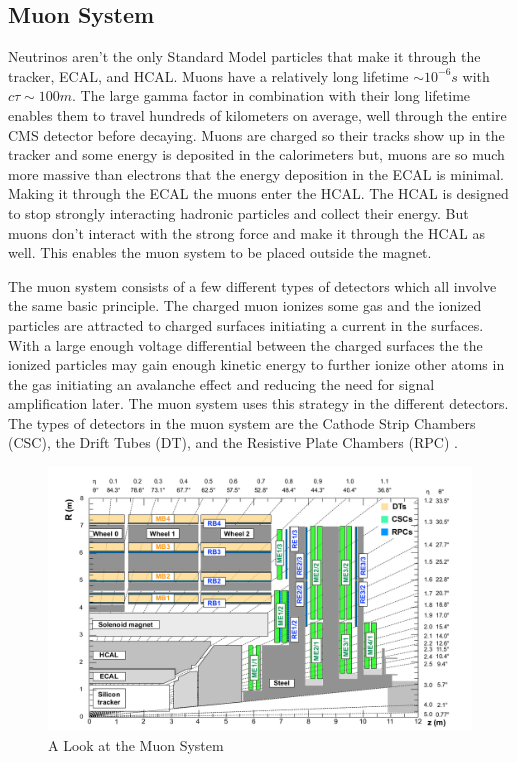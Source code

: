 \subsection{Muon System}
Neutrinos aren't the only Standard Model particles that make it through the tracker, ECAL, and HCAL. Muons have a relatively long lifetime $\sim 10^{-6} s$  with $c\tau \sim 100 m$. The large gamma factor in combination with their long lifetime enables them to travel hundreds of kilometers on average, well through the entire CMS detector before decaying. Muons are charged so their tracks show up in the tracker and some energy is deposited in the calorimeters but, muons are so much more massive than electrons that the energy deposition in the ECAL is minimal. Making it through the ECAL the muons enter the HCAL. The HCAL is designed to stop strongly interacting hadronic particles and collect their energy. But muons don't interact with the strong force and make it through the HCAL as well. This enables the muon system to be placed outside the magnet.

The muon system consists of a few different types of detectors which all involve the same basic principle. The charged muon ionizes some gas and the ionized particles are attracted to charged surfaces initiating a current in the surfaces. With a large enough voltage differential between the charged surfaces the the ionized particles may gain enough kinetic energy to further ionize other atoms in the gas initiating an avalanche effect and reducing the need for signal amplification later. The muon system uses this strategy in the different detectors. The types of detectors in the muon system are the Cathode Strip Chambers (CSC), the Drift Tubes (DT), and the Resistive Plate Chambers (RPC) \cite{tdr}.

\begin{figure}[h!]
  \centering
  \includegraphics[width=5.5in]{images/muon_system.png}
  \caption
   {A Look at the Muon System \cite{muonsys}}
  \label{fig:muonsysfig}
\end{figure}

